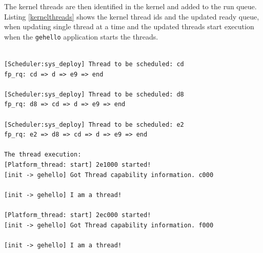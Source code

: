 The kernel threads are then identified in the kernel and added to the run queue. Listing \ref{kernelthreads} shows the kernel thread ids and the updated ready queue, when updating single thread at a time and  the updated threads start execution when the \texttt{gehello} application starts the threads.

\begin{lstlisting}[caption={The kernel thread ids and ready queue update},label={kernelthreads}, style=customcpp]

[Scheduler:sys_deploy] Thread to be scheduled: cd
fp_rq: cd => d => e9 => end

[Scheduler:sys_deploy] Thread to be scheduled: d8
fp_rq: d8 => cd => d => e9 => end

[Scheduler:sys_deploy] Thread to be scheduled: e2
fp_rq: e2 => d8 => cd => d => e9 => end

The thread execution:
[Platform_thread: start] 2e1000 started!
[init -> gehello] Got Thread capability information. c000

[init -> gehello] I am a thread!

[Platform_thread: start] 2ec000 started!
[init -> gehello] Got Thread capability information. f000

[init -> gehello] I am a thread!
\end{lstlisting}

